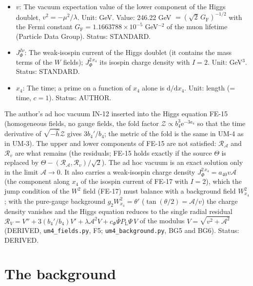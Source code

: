 \documentclass[
  10pt,
]{article}
\begin{document}
\begin{itemize}
\item
  \(v\): The vacuum expectation value of the lower component of the
  Higgs doublet, \(v^2 = -\mu^2/\lambda\). Unit: GeV. Value: 246.22 GeV
  \(= (\sqrt2\,G_{\mathrm{F}})^{-1/2}\) with the Fermi constant
  \(G_{\mathrm{F}} = 1.1663788\times10^{-5}\) GeV\(^{-2}\) of the muon
  lifetime (Particle Data Group). Status: STANDARD.
\item
  \(J_\Phi^{I\nu}\): The weak-isospin current of the Higgs doublet (it
  contains the mass terms of the \(W\) fields); \(J_\Phi^{2\,x_4}\) its
  isospin charge density with \(I = 2\). Unit: GeV\(^3\). Status:
  STANDARD.
\item
  \(x_4\): The time; a prime on a function of \(x_4\) alone is
  \(\mathrm{d}/\mathrm{d}x_4\). Unit: length (= time, \(c = 1\)).
  Status: AUTHOR.
\end{itemize}

The author's ad hoc vacuum IN-12 inserted into the Higgs equation FE-15
(homogeneous fields, no gauge fields, the fold factor
\(\mathcal{Z} \propto b_4^3\mathrm{e}^{-3a_4}\) so that the time
derivative of \(\sqrt{-\hat h}\mathcal{Z}\) gives \(3b_4'/b_4\); the
metric of the fold is the same in UM-4 as in UM-3). The upper and lower
components of FE-15 are not satisfied: \(\mathcal{R}_{\mathcal{A}}\) and
\(\mathcal{R}_v\) are what remains (the residuals; FE-15 holds exactly
if the source \(\Theta\) is replaced by
\(\Theta - (\mathcal{R}_{\mathcal{A}}, \mathcal{R}_v)/\sqrt2\)). The ad
hoc vacuum is an exact solution only in the limit \(\mathcal{A} \to 0\).
It also carries a weak-isospin charge density
\(J_\Phi^{2\,x_4} = a_{40}v\mathcal{A}\) (the component along \(x_4\) of
the isospin current of FE-17 with \(I = 2\)), which the jump condition
of the \(W^2\) field (FE-17) must balance with a background field
\(W^2_{x_4}\); with the pure-gauge background \(g_2W^2_{x_4} = \theta'\)
(\(\tan(\theta/2) = \mathcal{A}/v\)) the charge density vanishes and the
Higgs equation reduces to the single radial residual
\(\mathcal{R}_V = V'' + 3(b_4'/b_4)V' + \lambda\mathcal{A}^2V + c_\Phi\bar\Psi P_{\mathrm{L}}\Psi\,V\)
of the modulus \(V = \sqrt{v^2 + \mathcal{A}^2}\) (DERIVED,
\texttt{um4\_fields.py}, F5; \texttt{um4\_background.py}, BG5 and BG6).
Status: DERIVED.

\hypertarget{the-background}{%
\section{The background}\label{the-background}}
\end{document}
